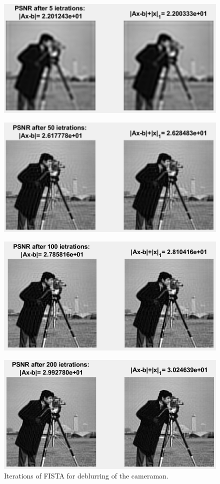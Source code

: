 \documentclass[12pt]{article}
\begin{document}
\begin{figure}[H]
  \centering
    \includegraphics[scale=0.9]{Fista5.png}
 \end{figure}
\begin{figure}[H]
  \centering
    \includegraphics[scale=0.9]{Fista50.png}
 \end{figure}
 \begin{figure}[H]
    \centering
    \includegraphics[scale=0.6]{Fista100.png}
\end{figure}
\begin{figure}[H]
    \centering
    \includegraphics[scale=0.6]{Fista200.png}
  \caption{Iterations of FISTA for deblurring of the cameraman.}
  \label{fig:FISTA}
\end{figure}
\end{document}
